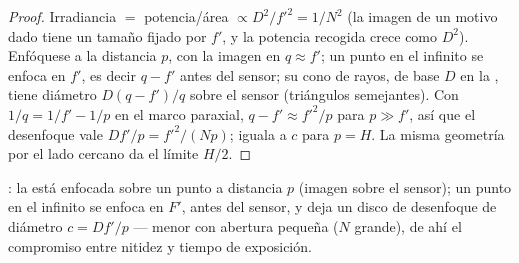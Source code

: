 \begin{proof}
Irradiancia $=$ potencia/área $\propto D^2/f'^2 = 1/N^2$ (la imagen de un
motivo dado tiene un tamaño fijado por $f'$, y la potencia recogida crece
como $D^2$). Enfóquese a la distancia $p$, con la imagen en $q \approx f'$;
un punto en el infinito se enfoca en $f'$, es decir $q - f'$ antes del
sensor; su cono de rayos, de base $D$ en la , tiene diámetro
$D(q - f')/q$ sobre el sensor (triángulos semejantes). Con
$1/q = 1/f' - 1/p$ en el marco paraxial, $q - f' \approx f'^2/p$ para
$p \gg f'$, así que el desenfoque vale $Df'/p = f'^2/(Np)$; iguala a $c$
para $p = H$. La misma geometría por el lado cercano da el límite $H/2$.
\end{proof}

\begin{omfigure}

{\small {}: la  está enfocada sobre un punto a
distancia $p$ (imagen sobre el sensor); un punto en el infinito se enfoca
en $F'$, antes del sensor, y deja un disco de desenfoque de diámetro
$c = Df'/p$ --- menor con abertura pequeña ($N$ grande), de ahí el
compromiso entre nitidez y tiempo de exposición.}
\end{omfigure}


